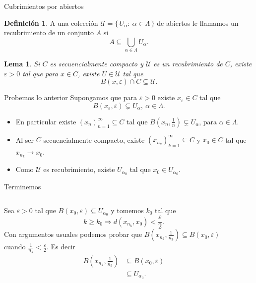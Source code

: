 \documentclass[utf8]{beamer}
\theoremstyle{plain}
\newtheorem{Lem}{Lema}                 %
\theoremstyle{definition}
\newtheorem{Def}{Definición}           %
\theoremstyle{remark}
\numberwithin{equation}{section}
\newcommand{\al}{\alpha}                %
\newcommand{\eps}{\varepsilon}          %
\newcommand{\La}{\Lambda}               %
\newcommand{\cU}{\mathcal{U}}           %
\newcommand{\set}[1]{\{\,#1\,\}}    %
\renewcommand{\geq}{\geqslant}          %
\newcommand{\To}{\Rightarrow}
\begin{document}
\begin{frame}{Cubrimientos por abiertos}
  \begin{Def}\label{def:recubrimiento}
  A una colecci\'on $\cU=\set{U_\al:\ \al\in\La}$ de abiertos le llamamos un \alert{recubrimiento} de un conjunto $A$ si 
  $$A\subseteq \bigcup_{\al\in\La}U_\al.$$
  \end{Def}
  \begin{Lem}\label{lem:lemaTecnico}
    Si $C$ es secuencialmente compacto y $\cU$ es un recubrimiento de $C$, existe $\eps>0$ tal que para $x\in C$, existe $U\in\cU$ tal que
    $$B(x,\eps)\cap C\subseteq\cU.$$
  \end{Lem}
\end{frame}

\begin{frame}{Probemos lo anterior}
  Supongamos que para $\eps>0$ existe $x_\eps\in C$ tal que 
  $$B(x_\eps,\eps)\subsetneq U_\al,\ \al\in \La.$$
  \begin{itemize}
    \item En particular existe $(x_n)_{n=1}^\infty\subseteq C$ tal que $B\left(x_n,\frac1n\right)\subsetneq U_\al$, para $\al\in \La$.
    \item Al ser $C$ secuencialmente compacto, existe $(x_{n_k})_{k=1}^\infty\subseteq C$ y $x_0\in C$ tal que $x_{n_k}\to x_0$.
    \item Como $\cU$ es recubrimiento, existe $U_{\al_0}$ tal que $x_0\in U_{\al_0}$.
  \end{itemize}
  

\end{frame}

\begin{frame}{Terminemos}
  \begin{columns}
    \begin{column}{0.5\textwidth}
      Sea $\eps>0$ tal que $B(x_0,\eps)\subseteq U_{\al_0}$ y tomemos $k_0$ tal que 
  $$k\geq k_0\To d(x_{n_k},x_0)<\frac{\eps}{2}.$$
  Con argumentos usuales podemos probar que $B\left(x_{n_k},\frac{1}{n_k}\right)\subseteq B(x_0,\eps)$ cuando $\frac{1}{n_k}<\frac{\eps}{2}$. Es decir
  \begin{align*}
    B\left(x_{n_k},\frac{1}{n_k}\right)&\subseteq B(x_0,\eps)\\
    &\subseteq U_{\al_0}.
  \end{align*}
    \end{column}
    \begin{column}{0.5\textwidth}%
      
    \end{column}
  \end{columns}
\end{frame}
\end{document}
